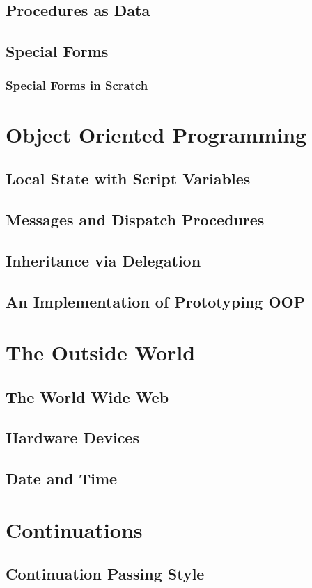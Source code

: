 \documentclass{report}
\begin{document}
\section{Procedures as Data}
\section{Special Forms}
\subsection{Special Forms in Scratch}
\chapter{Object Oriented Programming}
\section{Local State with Script Variables}
\section{Messages and Dispatch Procedures}
\section{Inheritance via Delegation}
\section{An Implementation of Prototyping OOP}
\chapter{The Outside World}
\section{The World Wide Web}
\section{Hardware Devices}
\section{Date and Time}
\chapter{Continuations}
\section{Continuation Passing Style}
\end{document}
